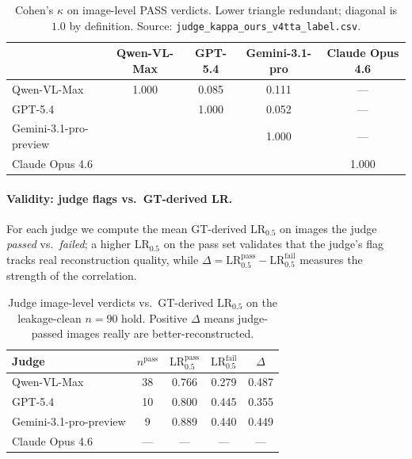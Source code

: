 \documentclass{article}
\begin{document}
\begin{table}[h]
\centering
\caption{Cohen's $\kappa$ on image-level PASS verdicts. Lower
triangle redundant; diagonal is $1.0$ by definition. Source:
\texttt{judge\_kappa\_ours\_v4tta\_label.csv}.}
\label{tab:judge-kappa}
\small
\begin{tabular}{lcccc}
\toprule
& Qwen-VL-Max & GPT-5.4 & Gemini-3.1-pro & Claude Opus 4.6 \\
\midrule
Qwen-VL-Max & 1.000    & 0.085    & 0.111    & ---      \\
GPT-5.4  &          & 1.000    & 0.052    & ---      \\
Gemini-3.1-pro-preview &          &          & 1.000    & ---      \\
Claude Opus 4.6 &          &          &          & 1.000    \\
\bottomrule
\end{tabular}
\end{table}

\paragraph{Validity: judge flags vs.\ GT-derived LR.}
For each judge we compute the mean GT-derived $\mathrm{LR}_{0.5}$
on images the judge \emph{passed} vs.\ \emph{failed}; a higher
$\mathrm{LR}_{0.5}$ on the pass set validates that the judge's
flag tracks real reconstruction quality, while
$\Delta{=}\mathrm{LR}_{0.5}^{\mathrm{pass}}-
\mathrm{LR}_{0.5}^{\mathrm{fail}}$ measures the strength of the
correlation.

\begin{table}[h]
\centering
\caption{Judge image-level verdicts vs.\ GT-derived $\mathrm{LR}_{0.5}$
on the leakage-clean $n{=}90$ hold. Positive $\Delta$ means
judge-passed images really are better-reconstructed.}
\label{tab:judge-vs-lr}
\small
\begin{tabular}{lcccc}
\toprule
Judge & $n^{\mathrm{pass}}$ & $\mathrm{LR}_{0.5}^{\mathrm{pass}}$ &
        $\mathrm{LR}_{0.5}^{\mathrm{fail}}$ & $\Delta$ \\
\midrule
Qwen-VL-Max                 & 38 & 0.766 & 0.279 &  0.487 \\
GPT-5.4                     & 10 & 0.800 & 0.445 &  0.355 \\
Gemini-3.1-pro-preview      &  9 & 0.889 & 0.440 &  0.449 \\
Claude Opus 4.6             & --- & --- & --- & --- \\
\bottomrule
\end{tabular}
\end{table}
\end{document}
